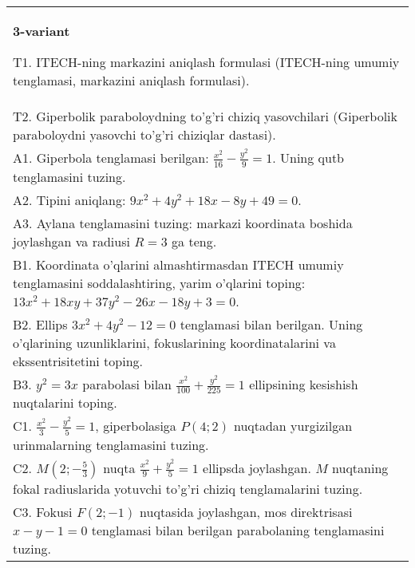 \documentclass{article}
\begin{document}
\begin{tabular}{m{17cm}}
\textbf{3-variant}
\newline

T1. ITECH-ning markazini aniqlash formulasi (ITECH-ning umumiy tenglamasi, markazini aniqlash formulasi).\\

T2. Giperbolik paraboloydning to'g'ri chiziq yasovchilari (Giperbolik paraboloydni yasovchi to'g'ri chiziqlar dastasi).\\

A1. Giperbola tenglamasi berilgan: $\frac{x^{2}}{16}-\frac{y^{2}}{9}=1$. Uning qutb tenglamasini tuzing.\\

A2. Tipini aniqlang: $9x^{2}+4y^{2}+18x-8y+49=0$.\\

A3. Aylana tenglamasini tuzing: markazi koordinata boshida joylashgan va radiusi $R=3$ ga teng.\\

B1. Koordinata o'qlarini almashtirmasdan ITECH umumiy tenglamasini soddalashtiring, yarim o'qlarini toping: $13x^{2} + 18xy + 37y^{2} - 26x - 18y + 3 = 0$.  \\

B2. Ellips $3x^{2} + 4y^{2} - 12 = 0$ tenglamasi bilan berilgan. Uning o'qlarining uzunliklarini, fokuslarining koordinatalarini va ekssentrisitetini toping.  \\

B3. $y^{2} = 3x$ parabolasi bilan $\frac{x^{2}}{100} + \frac{y^{2}}{225} = 1$ ellipsining kesishish nuqtalarini toping.  \\

C1. $\frac{x^{2}}{3} - \frac{y^{2}}{5} = 1$, giperbolasiga $P(4;2)$ nuqtadan yurgizilgan urinmalarning tenglamasini tuzing.  \\

C2. $M(2; - \frac{5}{3})$ nuqta $\frac{x^{2}}{9} + \frac{y^{2}}{5} = 1$ ellipsda joylashgan. $M$ nuqtaning fokal radiuslarida yotuvchi to'g'ri chiziq tenglamalarini tuzing.  \\

C3. Fokusi $F(2; - 1)$ nuqtasida joylashgan, mos direktrisasi $x - y - 1 = 0$ tenglamasi bilan berilgan parabolaning tenglamasini tuzing.  \\

\end{tabular}
\vspace{1cm}
\end{document}
